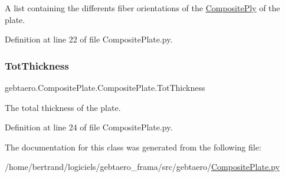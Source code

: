 A list containing the differents fiber orientations of the \hyperlink{namespacegebtaero_1_1_composite_ply}{Composite\+Ply} of the plate. 



Definition at line 22 of file Composite\+Plate.\+py.

\mbox{\label{classgebtaero_1_1_composite_plate_1_1_composite_plate_ad0af7183e0e49cba1a3a9ad8e794e311}} 
\subsubsection{\texorpdfstring{Tot\+Thickness}{TotThickness}}
{\footnotesize\ttfamily gebtaero.\+Composite\+Plate.\+Composite\+Plate.\+Tot\+Thickness}



The total thickness of the plate. 



Definition at line 24 of file Composite\+Plate.\+py.



The documentation for this class was generated from the following file\+:\begin{DoxyCompactItemize}
\item 
/home/bertrand/logiciels/gebtaero\+\_\+frama/src/gebtaero/\hyperlink{_composite_plate_8py}{Composite\+Plate.\+py}\end{DoxyCompactItemize}
